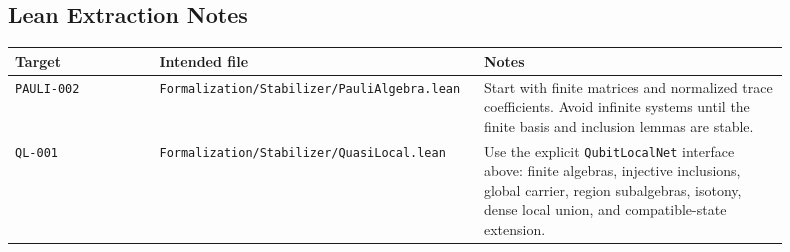 \documentclass{article}
\begin{document}
\subsection*{Lean Extraction Notes}

\begin{longtable}{@{}p{0.18\linewidth}p{0.34\linewidth}p{0.38\linewidth}@{}}
\toprule
Target & Intended file & Notes \\
\midrule
\endhead
\texttt{PAULI-002} &
\texttt{Formalization/Stabilizer/PauliAlgebra.lean} &
Start with finite matrices and normalized trace coefficients.  Avoid infinite
systems until the finite basis and inclusion lemmas are stable. \\
\texttt{QL-001} &
\texttt{Formalization/Stabilizer/QuasiLocal.lean} &
Use the explicit \texttt{QubitLocalNet} interface above: finite algebras,
injective inclusions, global carrier, region subalgebras, isotony, dense local
union, and compatible-state extension. \\
\bottomrule
\end{longtable}
\end{document}
